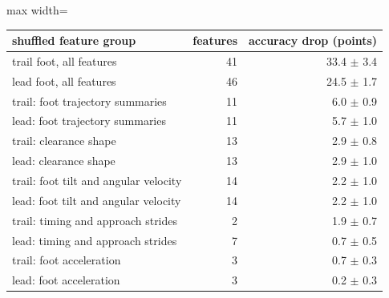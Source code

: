 \begin{adjustbox}{max width=\textwidth}
{\footnotesize
\begin{tabular}{lrr}
\toprule
\textbf{shuffled feature group} & \textbf{features} & \textbf{accuracy drop (points)} \\
\midrule
trail foot, all features & 41 & 33.4 $\pm$ 3.4 \\
lead foot, all features & 46 & 24.5 $\pm$ 1.7 \\
trail: foot trajectory summaries & 11 & 6.0 $\pm$ 0.9 \\
lead: foot trajectory summaries & 11 & 5.7 $\pm$ 1.0 \\
trail: clearance shape & 13 & 2.9 $\pm$ 0.8 \\
lead: clearance shape & 13 & 2.9 $\pm$ 1.0 \\
trail: foot tilt and angular velocity & 14 & 2.2 $\pm$ 1.0 \\
lead: foot tilt and angular velocity & 14 & 2.2 $\pm$ 1.0 \\
trail: timing and approach strides & 2 & 1.9 $\pm$ 0.7 \\
lead: timing and approach strides & 7 & 0.7 $\pm$ 0.5 \\
trail: foot acceleration & 3 & 0.7 $\pm$ 0.3 \\
lead: foot acceleration & 3 & 0.2 $\pm$ 0.3 \\
\bottomrule
\end{tabular}
}
\end{adjustbox}
